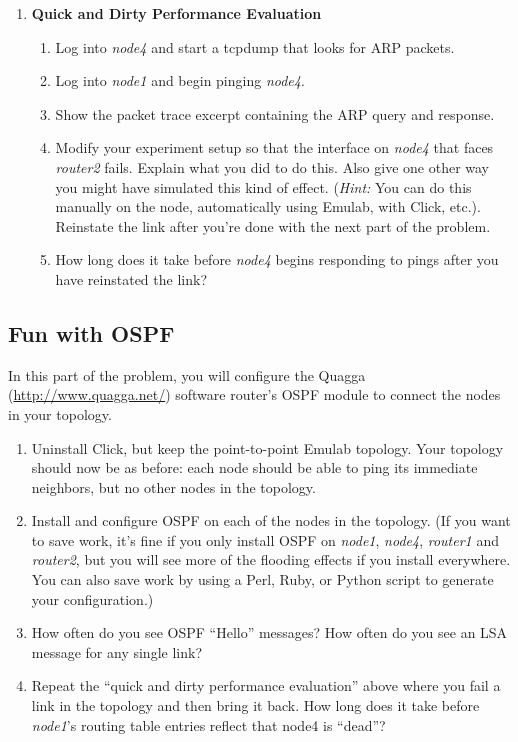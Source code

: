 \documentclass[11pt]{article}
\begin{document}
\begin{enumerate}
\item{\bf Quick and Dirty Performance Evaluation}
  \begin{enumerate}
    \itemsep=-1pt
    \item Log into {\em node4} and start a tcpdump that looks for ARP
      packets. 
    \item Log into {\em node1} and begin pinging {\em node4}.
    \item Show the packet trace excerpt containing the ARP query and response.  
    \item Modify your experiment setup so that the interface on {\em
      node4} that faces {\em router2} fails.  Explain what you did to do
      this.  Also give one other way you might have simulated this kind
      of effect.  ({\em Hint:} You can do this manually on the node,
      automatically using Emulab, with Click, etc.).  Reinstate the link
      after you're done with the next part of the problem.
    \item How long does it take before {\em node4} begins responding to
      pings after you have reinstated the link? 
  \end{enumerate}

\end{enumerate}

\subsection*{Fun with OSPF}

In this part of the problem, you will configure the
Quagga (\url{http://www.quagga.net/}) software router's OSPF module to
connect the nodes in your topology.

\begin{enumerate}
\itemsep=-1pt
\item Uninstall Click, but keep the point-to-point Emulab topology.
  Your topology should now be as before: each node should be able to
  ping its immediate neighbors, but no other nodes in the topology. 
\item Install and configure OSPF on each of the nodes in the topology.
  (If you want to save work, it's fine if you only install OSPF on {\em
  node1}, {\em node4}, {\em router1} and {\em router2}, but you will see
  more of the flooding effects if you install everywhere.  You can also
  save work by using a Perl, Ruby, or Python script to generate your
  configuration.)
\item How often do you see OSPF ``Hello'' messages?  How often do you
  see an LSA message for any single link?
\item Repeat the ``quick and dirty performance evaluation'' above where
  you fail a link in the topology and then bring it back.  How long does
  it take before {\em node1}'s routing table entries reflect that node4
  is ``dead''? 
\end{enumerate}
\end{document}

